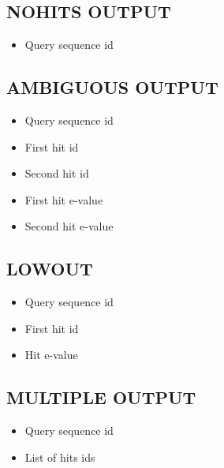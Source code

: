 \documentclass[letterpaper,10pt,english]{sphinxmanual}
\begin{document}
\subsection{NOHITS OUTPUT}
\label{defs:nohitsout}\label{defs:nohits-output}\begin{itemize}
\item {} 
Query sequence id

\end{itemize}


\subsection{AMBIGUOUS OUTPUT}
\label{defs:ambiguousout}\label{defs:ambiguous-output}\begin{itemize}
\item {} 
Query sequence id

\item {} 
First hit id

\item {} 
Second hit id

\item {} 
First hit e-value

\item {} 
Second hit e-value

\end{itemize}


\subsection{LOWOUT}
\label{defs:id10}\label{defs:lowout}\begin{itemize}
\item {} 
Query sequence id

\item {} 
First hit id

\item {} 
Hit e-value

\end{itemize}


\subsection{MULTIPLE OUTPUT}
\label{defs:multipleout}\label{defs:multiple-output}\begin{itemize}
\item {} 
Query sequence id

\item {} 
List of hits ids

\end{itemize}
\end{document}
